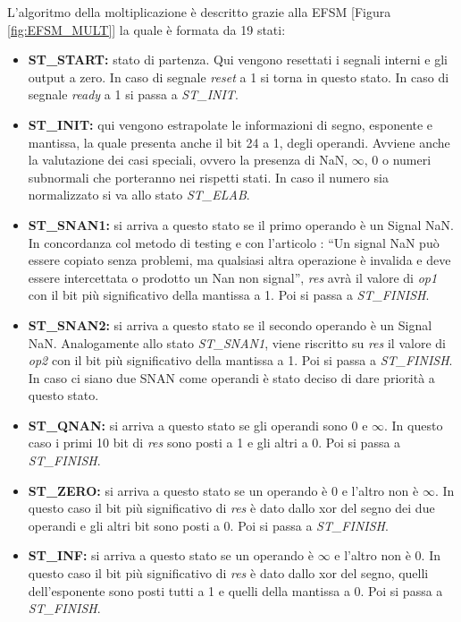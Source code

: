 \documentclass[]{IEEEtran}
\begin{document}
L'algoritmo della moltiplicazione è descritto grazie alla EFSM [Figura \ref{fig:EFSM_MULT}] la quale è formata da 19 stati:
\begin{itemize}
    \item \textbf{ST\_START:} stato di partenza. Qui vengono resettati i segnali interni e gli output a zero. In caso di segnale \textit{reset} a 1 si torna in questo stato. In caso di segnale \textit{ready} a 1 si passa a \textit{ST\_INIT}.
    \item \textbf{ST\_INIT:} qui vengono estrapolate le informazioni di segno, esponente e mantissa, la quale presenta anche il bit 24 a 1, degli operandi. Avviene anche la valutazione dei casi speciali, ovvero la presenza di NaN, $\infty$, 0 o numeri subnormali che porteranno nei rispetti stati. In caso il numero sia normalizzato si va allo stato \textit{ST\_ELAB}.
    \item \textbf{ST\_SNAN1:} si arriva a questo stato se il primo operando è un Signal NaN. In concordanza col metodo di testing e con l'articolo \cite{IEEE754Note}: ``Un signal NaN può essere copiato senza problemi, ma qualsiasi altra operazione è invalida e deve essere intercettata o prodotto un Nan non signal'', \textit{res} avrà il valore di \textit{op1} con il bit più significativo della mantissa a 1. Poi si passa a \textit{ST\_FINISH}.
    \item \textbf{ST\_SNAN2:} si arriva a questo stato se il secondo operando è un Signal NaN. Analogamente allo stato \textit{ST\_SNAN1}, viene riscritto su \textit{res} il valore di \textit{op2} con il bit più significativo della mantissa a 1. Poi si passa a \textit{ST\_FINISH}. In caso ci siano due SNAN come operandi è stato deciso di dare priorità a questo stato.
    \item \textbf{ST\_QNAN:} si arriva a questo stato se gli operandi sono 0 e $\infty$. In questo caso i primi 10 bit di \textit{res} sono posti a 1 e gli altri a 0. Poi si passa a \textit{ST\_FINISH}.
    \item \textbf{ST\_ZERO:} si arriva a questo stato se un operando è 0 e l'altro non è $\infty$. In questo caso il bit più significativo di \textit{res} è dato dallo xor del segno dei due operandi e gli altri bit sono posti a 0. Poi si passa a \textit{ST\_FINISH}.
    \item \textbf{ST\_INF:} si arriva a questo stato se un operando è $\infty$ e l'altro non è 0. In questo caso il bit più significativo di \textit{res} è dato dallo xor del segno, quelli dell'esponente sono posti tutti a 1 e quelli della mantissa a 0. Poi si passa a \textit{ST\_FINISH}.

\end{itemize}
\end{document}
